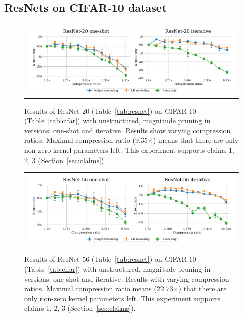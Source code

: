 \subsection{ResNets on CIFAR-10 dataset}

\nopagebreak

\begin{figure}[H]
\centering
\setlength{\tabcolsep}{0pt}
\begin{tabular}{c}
\includegraphics[width=1.0\linewidth]{pics/Resnet20-1s-iterative.pdf}
\end{tabular}
\caption{Results of ResNet-20 (Table~\ref{tab:resnet}) on CIFAR-10 (Table~\ref{tab:cifar}) with unstructured, magnitude pruning in versions: one-shot and iterative. Results show varying compression ratios. Maximal compression ratio (9.35$\times$) means that there are only  non-zero kernel parameters left. This experiment supports claims 1, 2, 3 (Section~\ref{sec:claims}).}
\label{fig:resnet20-1}
\end{figure}

\begin{figure}[H]
\setlength{\tabcolsep}{0pt}
\centering
    \begin{tabular}{c}
      \includegraphics[width=1.0\linewidth]{pics/Resnet56-1s-iterative.pdf}
    \end{tabular}
\caption{Results of ResNet-56 (Table~\ref{tab:resnet}) on CIFAR-10 (Table~\ref{tab:cifar}) with unstructured, magnitude pruning in versions: one-shot and iterative. Results with varying compression ratios. Maximal compression ratio means (22.73$\times$) that there are only  non-zero kernel parameters left. This experiment supports claims 1, 2, 3 (Section~\ref{sec:claims}).}
\label{fig:resnet56}
\end{figure}

